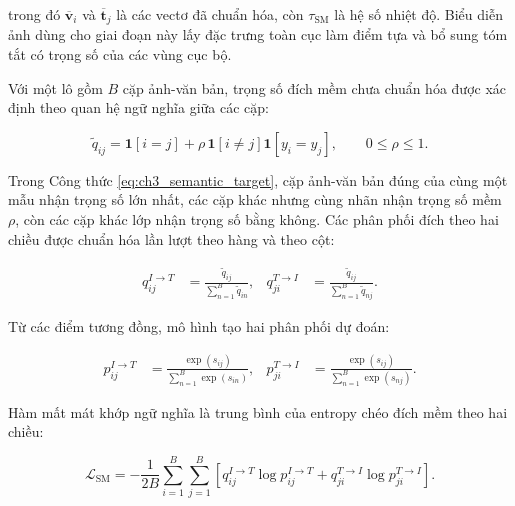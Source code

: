 trong đó $\overline{\boldsymbol{v}}_{i}$ và $\overline{\boldsymbol{t}}_{j}$ là các vectơ đã chuẩn hóa, còn $\tau_{\mathrm{SM}}$ là hệ số nhiệt độ. Biểu diễn ảnh dùng cho giai đoạn này lấy đặc trưng toàn cục làm điểm tựa và bổ sung tóm tắt có trọng số của các vùng cục bộ.

Với một lô gồm $B$ cặp ảnh-văn bản, trọng số đích mềm chưa chuẩn hóa được xác định theo quan hệ ngữ nghĩa giữa các cặp:

\begin{equation}
\widetilde{q}_{ij}
=
\mathbf{1}\left[i=j\right]
+
\rho\,
\mathbf{1}\left[i\neq j\right]
\mathbf{1}\left[y_i=y_j\right],
\qquad
0\leq\rho\leq 1.
\label{eq:ch3_semantic_target}
\end{equation}

Trong Công thức \ref{eq:ch3_semantic_target}, cặp ảnh-văn bản đúng của cùng một mẫu nhận trọng số lớn nhất, các cặp khác nhưng cùng nhãn nhận trọng số mềm $\rho$, còn các cặp khác lớp nhận trọng số bằng không. Các phân phối đích theo hai chiều được chuẩn hóa lần lượt theo hàng và theo cột:

\begin{equation}
\begin{aligned}
q_{ij}^{I\rightarrow T}
&=
\frac{\widetilde{q}_{ij}}
{\sum_{n=1}^{B}\widetilde{q}_{in}},
&
q_{ji}^{T\rightarrow I}
&=
\frac{\widetilde{q}_{ij}}
{\sum_{n=1}^{B}\widetilde{q}_{nj}}.
\end{aligned}
\label{eq:ch3_semantic_target_normalization}
\end{equation}

Từ các điểm tương đồng, mô hình tạo hai phân phối dự đoán:

\begin{equation}
\begin{aligned}
p_{ij}^{I\rightarrow T}
&=
\frac{\exp\left(s_{ij}\right)}
{\sum_{n=1}^{B}\exp\left(s_{in}\right)},
&
p_{ji}^{T\rightarrow I}
&=
\frac{\exp\left(s_{ij}\right)}
{\sum_{n=1}^{B}\exp\left(s_{nj}\right)}.
\end{aligned}
\label{eq:ch3_semantic_predictions}
\end{equation}

Hàm mất mát khớp ngữ nghĩa là trung bình của entropy chéo đích mềm theo hai chiều:

\begin{equation}
\mathcal{L}_{\mathrm{SM}}
=
-
\frac{1}{2B}
\sum_{i=1}^{B}
\sum_{j=1}^{B}
\left[
q_{ij}^{I\rightarrow T}
\log p_{ij}^{I\rightarrow T}
+
q_{ji}^{T\rightarrow I}
\log p_{ji}^{T\rightarrow I}
\right].
\label{eq:ch3_phase1_loss}
\end{equation}

